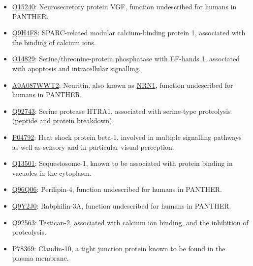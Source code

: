 {
\small

\begin{itemize}
\item \href{http://www.pantherdb.org/genes/gene.do?acc=HUMAN\%7CHGNC\%3D12684\%7CUniProtKB\%3DO15240}{O15240}: Neurosecretory protein VGF, function undescribed for humans in PANTHER.
\item \href{http://www.pantherdb.org/genes/gene.do?acc=HUMAN\%7CHGNC\%3D20318\%7CUniProtKB\%3DQ9H4F8}{Q9H4F8}: SPARC-related modular calcium-binding protein 1, associated with the binding of calcium ions.
\item \href{http://www.pantherdb.org/genes/gene.do?acc=HUMAN\%7CHGNC\%3D9243\%7CUniProtKB\%3DO14829}{O14829}: Serine/threonine-protein phosphatase with EF-hands 1, associated with apoptosis and intracellular signalling.
\item \href{http://www.pantherdb.org/genes/gene.do?acc=HUMAN\%7CHGNC\%3D17972\%7CUniProtKB\%3DQ9NPD7}{A0A087WWT2}: Neuritin, also known as \href{https://www.uniprot.org/uniprot/A0A087WWT2}{NRN1}, function undescribed for humans in PANTHER.
\item \href{http://www.pantherdb.org/genes/gene.do?acc=HUMAN\%7CHGNC\%3D9476\%7CUniProtKB\%3DQ92743}{Q92743}: Serine protease HTRA1, associated with serine-type proteolysis (peptide and protein breakdown).
\item \href{http://www.pantherdb.org/genes/gene.do?acc=HUMAN\%7CHGNC\%3D5246\%7CUniProtKB\%3DP04792}{P04792}: Heat shock protein beta-1, involved in multiple signalling pathways as well as sensory and in particular visual perception.
\item \href{http://www.pantherdb.org/genes/gene.do?acc=HUMAN\%7CHGNC\%3D11280\%7CUniProtKB\%3DQ13501}{Q13501}: Sequestosome-1, known to be associated with protein binding in vacuoles in the cytoplasm.
\item \href{http://www.pantherdb.org/genes/gene.do?acc=HUMAN\%7CHGNC\%3D29393\%7CUniProtKB\%3DQ96Q06}{Q96Q06}: Perilipin-4, function undescribed for humans in PANTHER.
\item \href{http://www.pantherdb.org/genes/gene.do?acc=HUMAN\%7CHGNC\%3D17056\%7CUniProtKB\%3DQ9Y2J0}{Q9Y2J0}: Rabphilin-3A, function undescribed for humans in PANTHER.
\item \href{http://www.pantherdb.org/genes/gene.do?acc=HUMAN\%7CHGNC\%3D13564\%7CUniProtKB\%3DQ92563}{Q92563}: Testican-2, associated with calcium ion binding, and the inhibition of proteolysis.
\item \href{http://www.pantherdb.org/genes/gene.do?acc=HUMAN\%7CHGNC\%3D2033\%7CUniProtKB\%3DP78369}{P78369}: Claudin-10,  a tight junction protein known to be found in the plasma membrane.

\end{itemize}}
